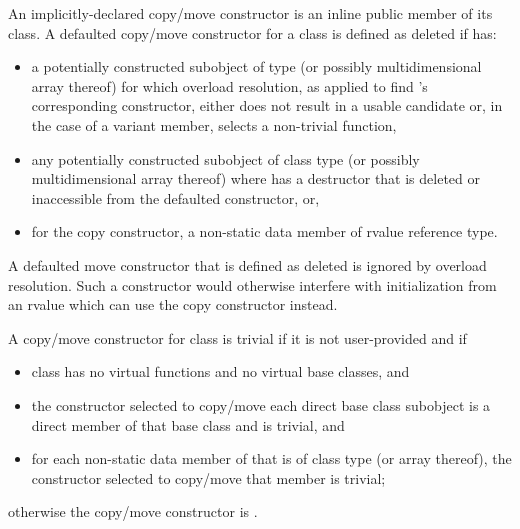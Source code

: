 \pnum
An implicitly-declared copy/move constructor is an
inline public member of its class.
A defaulted copy/\brk{}move constructor for a class
   is defined as deleted if  has:
\begin{itemize}
\item a potentially constructed subobject of type
   (or possibly multidimensional array thereof) for which
  overload resolution, as applied to find
  's corresponding constructor,
  either does not result in a usable candidate or,
  in the case of a variant member, selects a non-trivial function,

\item any potentially constructed subobject of
  class type  (or possibly multidimensional array thereof)
  where  has
  a destructor that is deleted or inaccessible from the defaulted
  constructor, or,

\item for the copy constructor, a non-static data member of rvalue reference type.
\end{itemize}

\begin{note}
A defaulted move constructor that is defined as deleted is ignored by overload
resolution.
Such a constructor would otherwise interfere with initialization from
an rvalue which can use the copy constructor instead.
\end{note}

\pnum
{}%
%
A copy/move constructor for class
is
trivial
if it is not user-provided and if
\begin{itemize}
\item
class
has no virtual functions
and no virtual base classes, and

\item
the constructor selected to copy/move each direct base class subobject
is a direct member of that base class and is trivial, and

\item
for each non-static data member of
that is of class type (or array thereof),
the constructor selected to copy/move that member is trivial;
\end{itemize}

%
otherwise the copy/move constructor is
.

